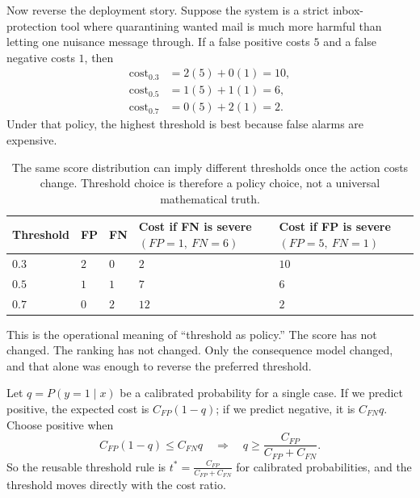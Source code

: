 Now reverse the deployment story. Suppose the system is a strict inbox-protection tool where quarantining wanted mail is much more harmful than letting one nuisance message through. If a false positive costs $5$ and a false negative costs $1$, then
\begin{align*}
\text{cost}_{0.3} &= 2(5)+0(1)=10, \\
\text{cost}_{0.5} &= 1(5)+1(1)=6, \\
\text{cost}_{0.7} &= 0(5)+2(1)=2.
\end{align*}
Under that policy, the highest threshold is best because false alarms are expensive.

\begin{table}[t]
\centering
\small
\setlength{\tabcolsep}{4pt}
\begin{tabular}{@{}>{\raggedright\arraybackslash}p{1.73cm}>{\centering\arraybackslash}p{0.99cm}>{\centering\arraybackslash}p{0.99cm}>{\centering\arraybackslash}p{2.97cm}>{\centering\arraybackslash}p{2.97cm}@{}}
\toprule
Threshold & FP & FN & Cost if FN is severe $(FP=1,\ FN=6)$ & Cost if FP is severe $(FP=5,\ FN=1)$ \\
\midrule
$0.3$ & $2$ & $0$ & $2$ & $10$ \\
$0.5$ & $1$ & $1$ & $7$ & $6$ \\
$0.7$ & $0$ & $2$ & $12$ & $2$ \\
\bottomrule
\end{tabular}
\caption{The same score distribution can imply different thresholds once the action costs change. Threshold choice is therefore a policy choice, not a universal mathematical truth.}
\label{tab:threshold-cost-matrix}
\end{table}

This is the operational meaning of ``threshold as policy.'' The score has not changed. The ranking has not changed. Only the consequence model changed, and that alone was enough to reverse the preferred threshold.

\begin{mathlens}
Let $q=P(y=1\mid x)$ be a calibrated probability for a single case. If we predict positive, the expected cost is $C_{FP}(1-q)$; if we predict negative, it is $C_{FN}q$. Choose positive when
\[
C_{FP}(1-q)\le C_{FN}q
\quad\Rightarrow\quad
q\ge \frac{C_{FP}}{C_{FP}+C_{FN}}.
\]
So the reusable threshold rule is $t^*=\frac{C_{FP}}{C_{FP}+C_{FN}}$ for calibrated probabilities, and the threshold moves directly with the cost ratio.
\end{mathlens}

